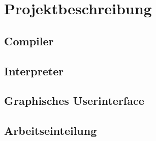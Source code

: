 

\chapter{Projektbeschreibung}

\section{Compiler}



\section{Interpreter}

\section{Graphisches Userinterface}


\section{Arbeitseinteilung}